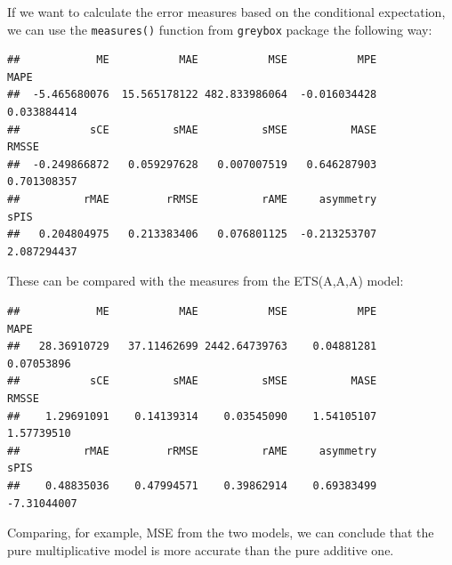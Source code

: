 \documentclass[
]{book}
\newenvironment{Shaded}{\begin{snugshade}}{\end{snugshade}}
\newcommand{\FunctionTok}[1]{\textcolor[rgb]{0.00,0.00,0.00}{#1}}
\newcommand{\NormalTok}[1]{#1}
\newcommand{\SpecialCharTok}[1]{\textcolor[rgb]{0.00,0.00,0.00}{#1}}
\theoremstyle{definition}
\theoremstyle{definition}
\theoremstyle{definition}
\theoremstyle{definition}
\theoremstyle{remark}
\begin{document}
If we want to calculate the error measures based on the conditional expectation, we can use the \texttt{measures()} function from \texttt{greybox} package the following way:

\begin{Shaded}
\end{Shaded}

\begin{verbatim}
##            ME           MAE           MSE           MPE          MAPE 
##  -5.465680076  15.565178122 482.833986064  -0.016034428   0.033884414 
##           sCE          sMAE          sMSE          MASE         RMSSE 
##  -0.249866872   0.059297628   0.007007519   0.646287903   0.701308357 
##          rMAE         rRMSE          rAME     asymmetry          sPIS 
##   0.204804975   0.213383406   0.076801125  -0.213253707   2.087294437
\end{verbatim}

These can be compared with the measures from the ETS(A,A,A) model:

\begin{Shaded}
\end{Shaded}

\begin{verbatim}
##            ME           MAE           MSE           MPE          MAPE 
##   28.36910729   37.11462699 2442.64739763    0.04881281    0.07053896 
##           sCE          sMAE          sMSE          MASE         RMSSE 
##    1.29691091    0.14139314    0.03545090    1.54105107    1.57739510 
##          rMAE         rRMSE          rAME     asymmetry          sPIS 
##    0.48835036    0.47994571    0.39862914    0.69383499   -7.31044007
\end{verbatim}

Comparing, for example, MSE from the two models, we can conclude that the pure multiplicative model is more accurate than the pure additive one.
\end{document}
